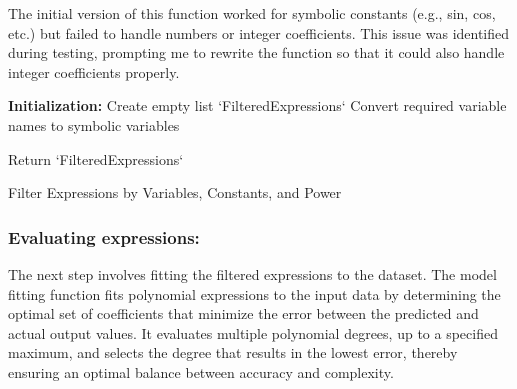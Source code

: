\documentclass{article}
\begin{document}
The initial version of this function worked for symbolic constants (e.g., sin, cos, etc.) but failed to handle numbers or integer coefficients. This issue was identified during testing, prompting me to rewrite the function so that it could also handle integer coefficients properly.\\



\begin{algorithm}[H]
\SetAlgoLined
{}

\textbf{Initialization:}\;
Create empty list `FilteredExpressions`\;
Convert required variable names to symbolic variables\;


Return `FilteredExpressions`\;

\caption{Filter Expressions by Variables, Constants, and Power}
\label{alg:filter_expressions} %
\end{algorithm}





\subsubsection{Evaluating expressions:}

The next step involves fitting the filtered expressions to the dataset. The model fitting function fits polynomial expressions to the input data by determining the optimal set of coefficients that minimize the error between the predicted and actual output values. It evaluates multiple polynomial degrees, up to a specified maximum, and selects the degree that results in the lowest error, thereby ensuring an optimal balance between accuracy and complexity.\\
\end{document}
